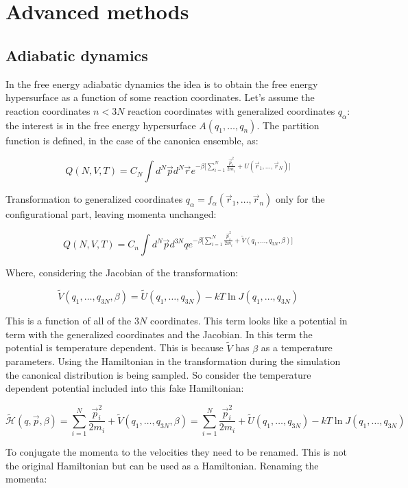 \graphicspath{{chapters/20/images}}
\chapter{Advanced methods}

\section{Adiabatic dynamics}
In the free energy adiabatic dynamics the idea is to obtain the free energy hypersurface as a function of some reaction coordinates.
Let's assume the reaction coordinates $n<3N$ reaction coordinates with generalized coordinates $q_\alpha$: the interest is in the free energy hypersurface $A(q_1, \dots, q_n)$.
The partition function is defined, in the case of the canonica ensemble, as:

$$Q(N, V, T) = C_N\int d^N\vec{p}d^N\vec{r}e^{-\beta\biggl[\sum\limits_{i=1}^N\frac{\vec{p}_i^2}{2m_i}+U(\vec{r}_1, \dots, \vec{r}_N)\biggr]}$$

Transformation to generalized coordinates $q_\alpha = f_\alpha(\vec{r}_1, \dots, \vec{r}_n)$ only for the configurational part, leaving momenta unchanged:

$$Q(N, V, T) = C_n\int d^N\vec{p}d^{3N}qe^{-\beta\biggl[\sum\limits_{i=1}^N\frac{\vec{p}_i^2}{2m_i} + \tilde{V}(q_1, \dots, q_{3N}, \beta)\biggr]}$$

Where, considering the Jacobian of the transformation:

$$\tilde{V}(q_1, \dots, q_{3N}, \beta) = \tilde{U}(q_1, \dots, q_{3N}) - kT\ln J(q_1, \dots, q_{3N})$$

This is a function of all of the $3N$ coordinates.
This term looks like a potential in term with the generalized coordinates and the Jacobian.
In this term the potential is temperature dependent.
This is because $\tilde{V}$ has $\beta$ as a temperature parameters.
Using the Hamiltonian in the transformation during the simulation the canonical distribution is being sampled.
So consider the temperature dependent potential included into this fake Hamiltonian:

$$\tilde{\mathcal{H}}(q, \vec{p}, \beta) = \sum\limits_{i=1}^N\frac{\vec{p}_i^2}{2m_i}+\tilde{V}(q_1, \dots, q_{3N}, \beta) = \sum\limits_{i=1}^N\frac{\vec{p}_i^2}{2m_i}+\tilde{U}(q_1, \dots, q_{3N})-kT\ln J(q_1, \dots, q_{3N})$$

To conjugate the momenta to the velocities they need to be renamed.
This is not the original Hamiltonian but can be used as a Hamiltonian.
Renaming the momenta:

